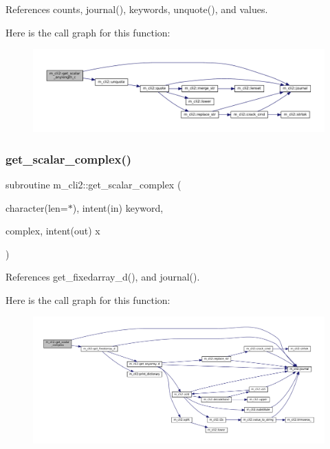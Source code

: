 References counts, journal(), keywords, unquote(), and values.

Here is the call graph for this function\+:\nopagebreak
\begin{figure}[H]
\begin{center}
\leavevmode
\includegraphics[width=350pt]{namespacem__cli2_a7429381c83a021ba3ffb32ed58e17a0e_cgraph}
\end{center}
\end{figure}
\mbox{\label{namespacem__cli2_a2af4dd786acb5cb2dbd6e43667109490}} 
\subsubsection{\texorpdfstring{get\+\_\+scalar\+\_\+complex()}{get\_scalar\_complex()}}
{\footnotesize\ttfamily subroutine m\+\_\+cli2\+::get\+\_\+scalar\+\_\+complex (\begin{DoxyParamCaption}\item[{character(len=$\ast$), intent(in)}]{keyword,  }\item[{complex, intent(out)}]{x }\end{DoxyParamCaption})\hspace{0.3cm}{\ttfamily [private]}}



References get\+\_\+fixedarray\+\_\+d(), and journal().

Here is the call graph for this function\+:\nopagebreak
\begin{figure}[H]
\begin{center}
\leavevmode
\includegraphics[width=350pt]{namespacem__cli2_a2af4dd786acb5cb2dbd6e43667109490_cgraph}
\end{center}
\end{figure}
\mbox{\label{namespacem__cli2_a338757660adde093db76b7d5559a1906}} 
